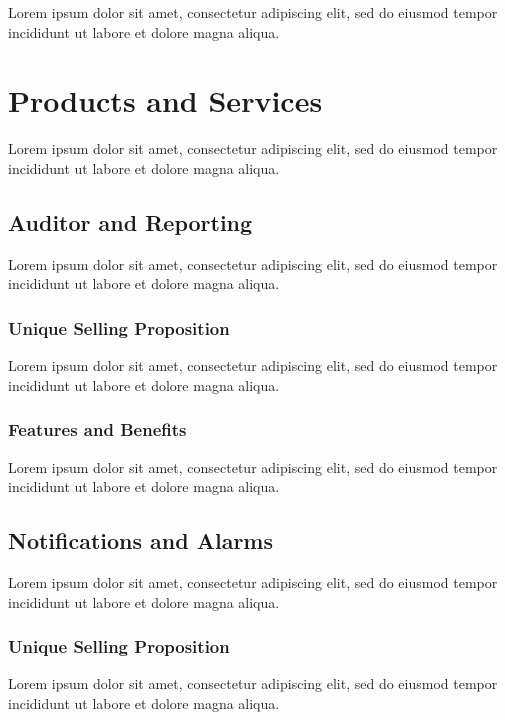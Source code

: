 Lorem ipsum dolor sit amet, consectetur adipiscing elit, sed do eiusmod tempor incididunt ut labore et dolore magna aliqua.


\section{Products and Services}
Lorem ipsum dolor sit amet, consectetur adipiscing elit, sed do eiusmod tempor incididunt ut labore et dolore magna aliqua.


\subsection{Auditor and Reporting}
Lorem ipsum dolor sit amet, consectetur adipiscing elit, sed do eiusmod tempor incididunt ut labore et dolore magna aliqua.

\subsubsection*{Unique Selling Proposition}
Lorem ipsum dolor sit amet, consectetur adipiscing elit, sed do eiusmod tempor incididunt ut labore et dolore magna aliqua.

\subsubsection*{Features and Benefits}
Lorem ipsum dolor sit amet, consectetur adipiscing elit, sed do eiusmod tempor incididunt ut labore et dolore magna aliqua.


\subsection{Notifications and Alarms}
Lorem ipsum dolor sit amet, consectetur adipiscing elit, sed do eiusmod tempor incididunt ut labore et dolore magna aliqua.

\subsubsection*{Unique Selling Proposition}
Lorem ipsum dolor sit amet, consectetur adipiscing elit, sed do eiusmod tempor incididunt ut labore et dolore magna aliqua.

